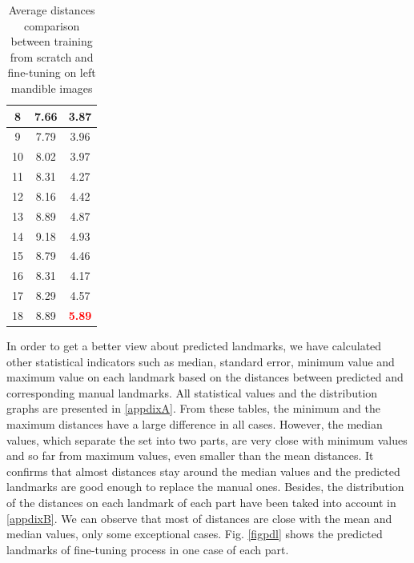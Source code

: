 \documentclass[review]{elsarticle}
\begin{document}
\begin{table}
\begin{minipage}[t]{0.45\textwidth}
\begin{tabular}{|c|c|c|}
	8 & 7.66 & 3.87  \\ \hline
	9 & 7.79 & 3.96 \\ \hline
	10 & 8.02 & 3.97 \\ \hline
	11 & 8.31 & 4.27 \\ \hline
	12 & 8.16 & 4.42 \\ \hline
	13 & 8.89 & 4.87 \\ \hline
	14 & 9.18 & 4.93 \\ \hline
	15 & 8.79 & 4.46 \\ \hline
	16 & 8.31 & 4.17 \\ \hline
	17 & 8.29 & 4.57 \\ \hline
	18 & 8.89 & \textcolor{red}{\textbf{5.89}} \\ \hline
		\end{tabular}
		\caption{Average distances comparison between training from scratch and fine-tuning on left mandible images}
		\label{cmpmd}
	\end{minipage}
\end{table}
In order to get a better view about predicted landmarks, we have calculated other statistical indicators such as median, standard error, minimum value and maximum value on each landmark based on the distances between predicted and corresponding manual landmarks. All statistical values and the distribution graphs are presented in \ref{appdixA}. From these tables, the minimum and the maximum distances have a large difference in all cases. However, the median values, which separate the set into two parts, are very close with minimum values and so far from maximum values, even smaller than the mean distances. It confirms that almost distances stay around the median values and the predicted landmarks are good enough to replace the manual ones. Besides, the distribution of the distances on each landmark of each part have been taked into account in \ref{appdixB}. We can observe that most of distances are close with the mean and median values, only some exceptional cases. Fig. \ref{figpdl} shows the predicted landmarks of fine-tuning process in one case of each part.
\end{document}
